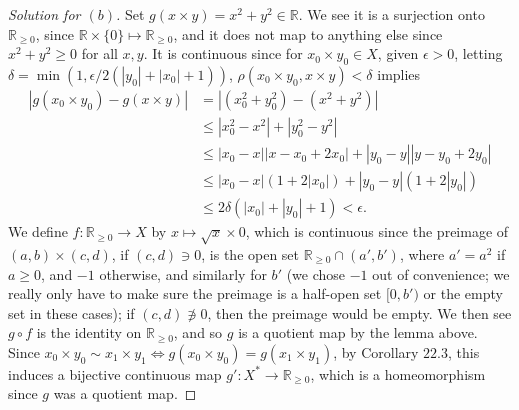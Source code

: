 \documentclass[12pt]{article}
\theoremstyle{remark}
\begin{document}
\begin{proof}[Solution for $(b)$]
  Set $g(x \times y) = x^2 + y^2 \in \mathbb{R}$. We see it is a surjection onto $\mathbb{R}_{\ge0}$, since $\mathbb{R} \times \{0\} \mapsto \mathbb{R}_{\ge 0}$, and it does not map to anything else since $x^2 + y^2 \ge 0$ for all $x,y$. It is continuous since for $x_0 \times y_0 \in X$, given $\epsilon > 0$, letting $\delta = \min(1,\epsilon/2(|y_0|+|x_0|+1))$, $\rho(x_0\times y_0,x \times y) < \delta$ implies
  \begin{align*}
    |g(x_0\times y_0) - g(x\times y)| &= |(x_0^2+y_0^2)-(x^2+y^2)|\\
    &\le |x_0^2-x^2| + |y_0^2-y^2|\\
    &\le |x_0-x||x-x_0+2x_0| + |y_0-y||y-y_0+2y_0|\\
    &\le |x_0-x|(1+2|x_0|) + |y_0-y|(1+2|y_0|)\\
    &\le 2\delta(|x_0| + |y_0| + 1) < \epsilon.
  \end{align*}
  We define $f\colon \mathbb{R}_{\ge 0} \to X$ by $x \mapsto \sqrt{x} \times 0$,
  which is continuous since the preimage of $(a,b) \times (c,d)$, if $(c,d) \ni
  0$, is the open set $\mathbb{R}_{\ge 0} \cap (a',b')$, where $a' = a^2$ if $a
  \ge 0$, and $-1$ otherwise, and similarly for $b'$ (we chose $-1$ out of
  convenience; we really only have to make sure the preimage is a half-open set
  $[0,b')$ or the empty set in these cases); if $(c,d) \not\ni 0$, then the
    preimage would be empty. We then see $g \circ f$ is the identity on
    $\mathbb{R}_{\ge0}$, and so $g$ is a quotient map by the lemma above. Since
    $x_0 \times y_0 \sim x_1 \times y_1 \iff g(x_0 \times y_0) = g(x_1 \times
  y_1)$, by Corollary $22.3$, this induces a bijective continuous map $g'\colon X^* \to \mathbb{R}_{\ge 0}$, which is a homeomorphism since $g$ was a quotient map.
\end{proof}
\end{document}
